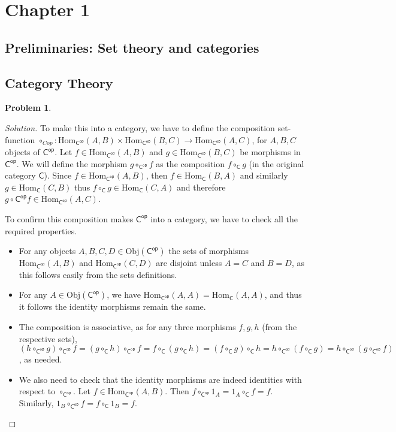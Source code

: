 \documentclass{article}
\theoremstyle{definition}
\newtheorem{problem-internal}{Problem}[subsection]
\newenvironment{problem}{
	\medskip
	\begin{problem-internal}
	}{
\end{problem-internal}
}
\newenvironment{solution}{
	\begin{proof}[Solution]
		\vspace{-8px}
		\setlength{\parskip}{4px}
		\setlength{\parindent}{0px}
	}{
\end{proof}
}
\newcommand{\Obj}{\mathrm{Obj}}
\newcommand{\Hom}{\mathrm{Hom}}
\newcommand{\C}{\mathsf{C}}
\newcommand{\Cop}{\mathsf{C^{op}}}
\begin{document}
\section*{Chapter 1}
\subsection*{Preliminaries: Set theory and categories}
\setcounter{subsection}{2}

\subsection{Category Theory}

\begin{problem}
\end{problem}

\begin{solution}
	To make this into a category, we have to define the composition set-function $\circ_{Cop} : \Hom_{\Cop}(A,B) \times \Hom_{\Cop}(B,C) \to \Hom_{\Cop}(A,C)$, for $A,B,C$ objects of $\Cop$. Let $f \in \Hom_{\Cop}(A,B)$ and $g \in \Hom_{\Cop}(B,C)$ be morphisms in $\Cop$. We will define the morphism $g \circ_{\Cop} f$ as the composition $f \circ_{\C} g$ (in the original category $\C$). Since $f \in \Hom_{\Cop}(A,B)$, then $f \in \Hom_{\C}(B,A)$ and similarly $g \in \Hom_{\C}(C,B)$ thus $f \circ_{\C} g \in \Hom_{\C}(C,A)$ and therefore $g \circ{\Cop} f \in \Hom_{\Cop}(A,C)$.
	
	To confirm this composition makes $\Cop$ into a category, we have to check all the required properties.
	\begin{itemize}
		\item For any objects $A, B, C, D \in \Obj(\Cop)$ the sets of morphisms $\Hom_{\Cop}(A,B)$ and $\Hom_{\Cop}(C,D)$ are disjoint unless $A=C$ and $B=D$, as this follows easily from the sets definitions.
		\item For any $A \in \Obj(\Cop)$, we have $\Hom_{\Cop}(A,A) = \Hom_{\C}(A,A)$, and thus it follows the identity morphisms remain the same.
		\item The composition is associative, as for any three morphisms $f,g,h$ (from the respective sets), $(h \circ_{\Cop} g) \circ_{\Cop} f = (g \circ_{\C} h) \circ_{\Cop} f = f \circ_{\C} (g \circ_{\C} h) = (f \circ_{\C} g) \circ_{\C} h = h \circ_{\Cop} (f \circ_{\C} g) = h \circ_{\Cop} (g \circ_{\Cop} f)$, as needed.
		\item We also need to check that the identity morphisms are indeed identities with respect to $\circ_{\Cop}$. Let $f \in \Hom_{\Cop}(A,B)$. Then $f \circ_{\Cop} 1_A = 1_A \circ_{\C} f = f$. Similarly, $1_B \circ_{\Cop} f = f \circ_{\C} 1_B = f$.
	\end{itemize}
\end{solution}
\end{document}
